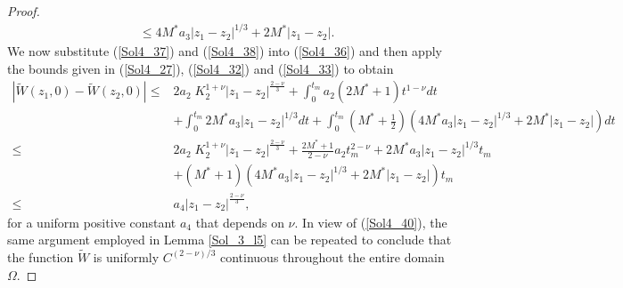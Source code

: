 \documentclass[10pt,a4paper]{amsart}
\begin{document}
\begin{proof}
\begin{equation*}
\begin{split}
             &\leq 4M^*a_3|z_1-z_2|^{1/3}+2M^*|z_1-z_2|.
         \end{split}
     \end{equation*}
     We now substitute (\ref{Sol4_37}) and (\ref{Sol4_38}) into (\ref{Sol4_36}) and then apply the bounds given in  (\ref{Sol4_27}), (\ref{Sol4_32}) and (\ref{Sol4_33}) to obtain
     \begin{equation}\label{Sol4_40}
         \begin{split}
             |\widetilde W(z_1,0)-\widetilde W(z_2,0)|\leq &2a_2 \;K_2^{1+\nu}|z_1-z_2|^\frac{2-\nu}{3}+\int_0^{t_m} a_2(2M^*+1)t^{1-\nu} dt\\
             &+ \int_0^{t_m} 2M^* a_3|z_1-z_2|^{1/3} dt+\int_0^{t_m} \left(M^*+\frac{1}{2}\right)\left(4M^*a_3|z_1-z_2|^{1/3}+2M^*|z_1-z_2|\right)dt\\
             \leq & 2a_2 \;K_2^{1+\nu}|z_1-z_2|^\frac{2-\nu}{3}+\frac{2M^*+1}{2-\nu}a_2t_m^{2-
             \nu}+2M^*a_3|z_1-z_2|^{1/3}t_m\\
             &+ (M^*+1)\left(4M^*a_3|z_1-z_2|^{1/3}+2M^*|z_1-z_2| \right)t_m\\
             \leq & a_4 |z_1-z_2|^{\frac{2-\nu}{3}},
         \end{split}
     \end{equation}
     for a uniform positive constant $a_4$ that depends on $\nu$. In view of (\ref{Sol4_40}), the same argument employed in Lemma \ref{Sol_3_l5} can be repeated to conclude that the function $\widetilde W$ is uniformly $C^{(2-\nu)/3}$ continuous throughout the entire domain $\Omega$.


\end{proof}
\end{document}
